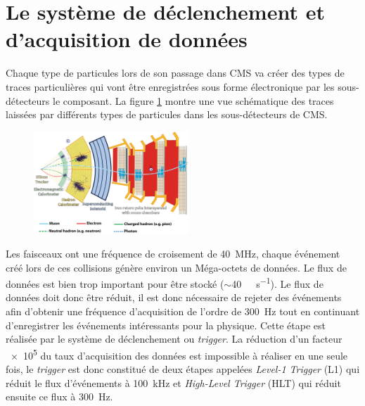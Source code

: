 \section{Le système de déclenchement et d'acquisition de données}
Chaque type de particules lors de son passage dans CMS va créer des types de traces particulières qui vont être enregistrées sous forme électronique par les sous-détecteurs le composant. La figure \ref{particules} montre une vue schématique des traces laissées par différents types de particules dans les sous-détecteurs de CMS.

	  \begin{figure}[ht!]
	\centering
	\includegraphics[width=0.52\textwidth]{CMS/particles.png}
	\label{particules}
\end{figure}

Les faisceaux ont une fréquence de croisement de \SI{40}{\mega\hertz}, chaque événement créé lors de ces collisions génère environ un Méga-octets de données. Le flux de données est bien trop important pour être stocké ($\sim$\SI{40}{\tera\byte\per\second}). Le flux de données doit donc être réduit, il est donc nécessaire de rejeter des événements afin d'obtenir une fréquence d'acquisition de l'ordre de \SI{300}{\hertz} tout en continuant d'enregistrer les événements intéressants pour la physique. Cette étape est réalisée par le système de déclenchement ou \textit{trigger}. La réduction d'un facteur \num{e5} du taux d'acquisition des données est impossible à réaliser en une seule fois, le \textit{trigger} est donc constitué de deux étapes appelées \textit{Level-1 Trigger} (L1) qui réduit le flux d'événements à \SI{100}{\kilo\hertz} et \textit{High-Level Trigger} (HLT) qui réduit ensuite ce flux à \SI{300}{\hertz}.

